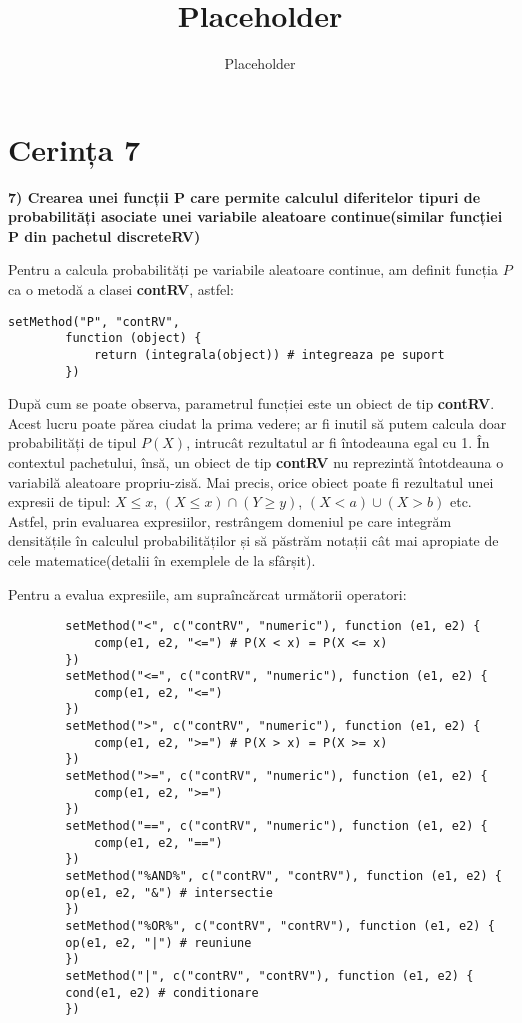 \documentclass[12pt]{article}
\title{Placeholder}
\author{Placeholder}
\begin{document}
	\section{Cerința 7}
	\textbf{7) Crearea unei funcții P care permite calculul diferitelor tipuri de probabilități asociate
		unei variabile aleatoare continue(similar funcției P din pachetul discreteRV) }\vspace{5mm}
	
	Pentru a calcula probabilități pe variabile aleatoare continue, am definit funcția $P$ ca o metodă a clasei \textbf{contRV}, astfel:
	\begin{lstlisting}[numbers=none]
		setMethod("P", "contRV",
		function (object) {
			return (integrala(object)) # integreaza pe suport
		})
	\end{lstlisting}

	După cum se poate observa, parametrul funcției este un obiect de tip \textbf{contRV}. Acest lucru poate părea ciudat la prima vedere; ar fi inutil să putem calcula doar probabilități de tipul $P(X)$, intrucât rezultatul ar fi întodeauna egal cu 1. În contextul pachetului, însă, un obiect de tip \textbf{contRV} nu reprezintă întotdeauna o variabilă aleatoare propriu-zisă. Mai precis, orice obiect poate fi rezultatul unei expresii de tipul: $X \leq x$, $(X \leq x) \cap  (Y \geq y)$, $(X < a) \cup (X > b)$ etc. Astfel, prin evaluarea expresiilor, restrângem domeniul pe care integrăm densitățile în calculul probabilităților și să păstrăm notații cât mai apropiate de cele matematice(detalii în exemplele de la sfârșit).\par
	
	Pentru a evalua expresiile, am supraîncărcat următorii operatori:
	\begin{lstlisting}
		setMethod("<", c("contRV", "numeric"), function (e1, e2) {
			comp(e1, e2, "<=") # P(X < x) = P(X <= x)
		})
		setMethod("<=", c("contRV", "numeric"), function (e1, e2) {
			comp(e1, e2, "<=")
		})
		setMethod(">", c("contRV", "numeric"), function (e1, e2) {
			comp(e1, e2, ">=") # P(X > x) = P(X >= x)
		})
		setMethod(">=", c("contRV", "numeric"), function (e1, e2) {
			comp(e1, e2, ">=")
		})
		setMethod("==", c("contRV", "numeric"), function (e1, e2) {
			comp(e1, e2, "==")
		})
		setMethod("%AND%", c("contRV", "contRV"), function (e1, e2) {
		op(e1, e2, "&") # intersectie
		})
		setMethod("%OR%", c("contRV", "contRV"), function (e1, e2) {
		op(e1, e2, "|") # reuniune
		})
		setMethod("|", c("contRV", "contRV"), function (e1, e2) {
		cond(e1, e2) # conditionare
		})
	\end{lstlisting}\pagebreak
\end{document}
